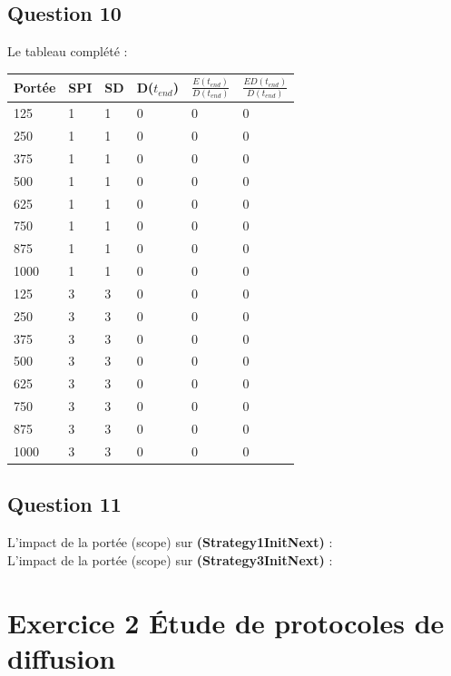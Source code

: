 \documentclass[10pt]{report}
\begin{document}
\subsection{Question 10}
Le tableau complété :\\

\begin{center}
\begin{tabular}{|l|l|l|l|l|l|} \hline
  Portée & SPI & SD & D($t_{end}$) & $\frac{E(t_{end})}{D(t_{end})}$ & $\frac{ED(t_{end})}{D(t_{end})}$\\ \hline
	125 & 1 & 1 & 0 & 0 & 0\\ \hline
	250 & 1 & 1 & 0 & 0 & 0\\ \hline
	375 & 1 & 1 & 0 & 0 & 0\\ \hline
	500 & 1 & 1 & 0 & 0 & 0\\ \hline
	625 & 1 & 1 & 0 & 0 & 0\\ \hline
	750 & 1 & 1 & 0 & 0 & 0\\ \hline
	875 & 1 & 1 & 0 & 0 & 0\\ \hline
	1000 & 1 & 1 & 0 & 0 & 0\\ \hline
	125 & 3 & 3 & 0 & 0 & 0\\ \hline
	250 & 3 & 3 & 0 & 0 & 0\\ \hline
	375 & 3 & 3 & 0 & 0 & 0\\ \hline
	500 & 3 & 3 & 0 & 0 & 0\\ \hline
	625 & 3 & 3 & 0 & 0 & 0\\ \hline
	750 & 3 & 3 & 0 & 0 & 0\\ \hline
	875 & 3 & 3 & 0 & 0 & 0\\ \hline
	1000 & 3 & 3 & 0 & 0 & 0\\ \hline
\end{tabular}
\end{center}

\subsection{Question 11}

L'impact de la portée (scope) sur \textbf{(Strategy1InitNext)} :\\

L'impact de la portée (scope) sur \textbf{(Strategy3InitNext)} :\\

\newpage
\section{Exercice 2  Étude de protocoles de diffusion}
\end{document}
